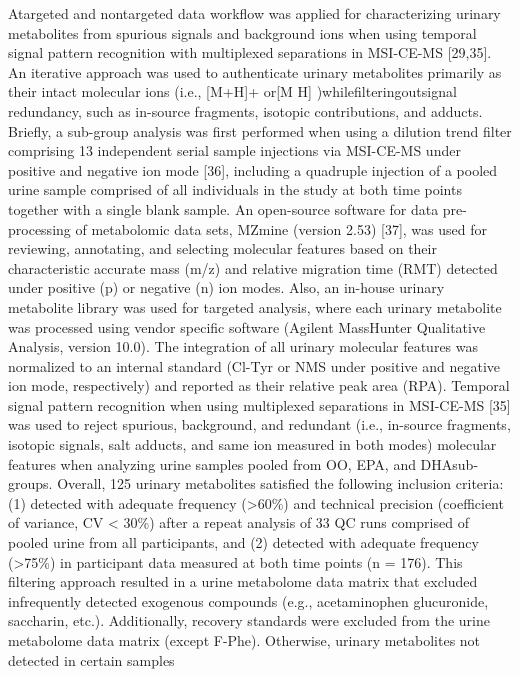 \documentclass[journal=jacsat,manuscript=article]{achemso}
\begin{document}
Atargeted and nontargeted data workflow was applied for characterizing
urinary metabolites from spurious signals and background ions when using
temporal signal pattern recognition with multiplexed separations in
MSI-CE-MS {[}29,35{]}. An iterative approach was used to authenticate
urinary metabolites primarily as their intact molecular ions (i.e.,
{[}M+H{]}+ or{[}M H{]} )whilefilteringoutsignal redundancy, such as
in-source fragments, isotopic contributions, and adducts. Briefly, a
sub-group analysis was first performed when using a dilution trend
filter comprising 13 independent serial sample injections via MSI-CE-MS
under positive and negative ion mode {[}36{]}, including a quadruple
injection of a pooled urine sample comprised of all individuals in the
study at both time points together with a single blank sample. An
open-source software for data pre-processing of metabolomic data sets,
MZmine (version 2.53) {[}37{]}, was used for reviewing, annotating, and
selecting molecular features based on their characteristic accurate mass
(m/z) and relative migration time (RMT) detected under positive (p) or
negative (n) ion modes. Also, an in-house urinary metabolite library was
used for targeted analysis, where each urinary metabolite was processed
using vendor specific software (Agilent MassHunter Qualitative Analysis,
version 10.0). The integration of all urinary molecular features was
normalized to an internal standard (Cl-Tyr or NMS under positive and
negative ion mode, respectively) and reported as their relative peak
area (RPA). Temporal signal pattern recognition when using multiplexed
separations in MSI-CE-MS {[}35{]} was used to reject spurious,
background, and redundant (i.e., in-source fragments, isotopic signals,
salt adducts, and same ion measured in both modes) molecular features
when analyzing urine samples pooled from OO, EPA, and DHAsub-groups.
Overall, 125 urinary metabolites satisfied the following inclusion
criteria: (1) detected with adequate frequency (\textgreater60\%) and
technical precision (coefficient of variance, CV \textless{} 30\%) after
a repeat analysis of 33 QC runs comprised of pooled urine from all
participants, and (2) detected with adequate frequency
(\textgreater75\%) in participant data measured at both time points (n =
176). This filtering approach resulted in a urine metabolome data matrix
that excluded infrequently detected exogenous compounds (e.g.,
acetaminophen glucuronide, saccharin, etc.). Additionally, recovery
standards were excluded from the urine metabolome data matrix (except
F-Phe). Otherwise, urinary metabolites not detected in certain samples
\end{document}
